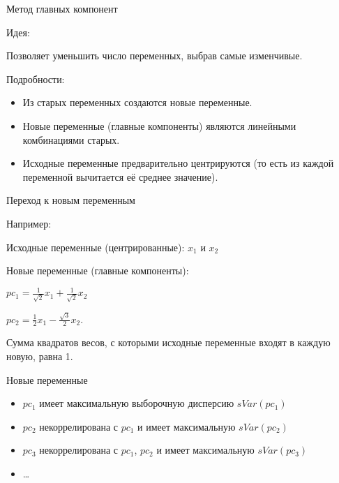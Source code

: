 \documentclass[russian,ignorenonframetext,]{beamer}
\providecommand{\tightlist}{%
  \setlength{\itemsep}{0pt}\setlength{\parskip}{0pt}}
\begin{document}
\begin{frame}{Метод главных компонент}

Идея:

Позволяет уменьшить число переменных, выбрав самые изменчивые.

Подробности:

\begin{itemize}
\item
  Из старых переменных создаются новые переменные.
\item
  Новые переменные (главные компоненты) являются линейными комбинациями
  старых.
\item
  Исходные переменные предварительно центрируются (то есть из каждой
  переменной вычитается её среднее значение).
\end{itemize}

\end{frame}

\begin{frame}{Переход к новым переменным}

Например:

Исходные переменные (центрированные): \(x_1\) и \(x_2\)

Новые переменные (главные компоненты):

\(pc_1=\frac{1}{\sqrt{2}}x_1+\frac{1}{\sqrt{2}}x_2\)

\(pc_2=\frac{1}{2}x_1-\frac{\sqrt{3}}{2}x_2\).

Сумма квадратов весов, с которыми исходные переменные входят в каждую
новую, равна 1.

\end{frame}

\begin{frame}{Новые переменные}

\begin{itemize}
\tightlist
\item
  \(pc_1\) имеет максимальную выборочную дисперсию \(sVar(pc_1)\)
\item
  \(pc_2\) некоррелирована с \(pc_1\) и имеет максимальную
  \(sVar(pc_2)\)
\item
  \(pc_3\) некоррелирована с \(pc_1\), \(pc_2\) и имеет максимальную
  \(sVar(pc_3)\)
\item
  \ldots{}
\end{itemize}

\end{frame}
\end{document}
